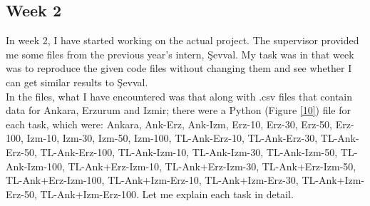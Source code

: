 \documentclass{article}
\begin{document}
\subsection{Week 2}
\hspace{0.5cm}
In week 2, I have started working on the actual project. The supervisor provided me some files from the previous year's intern, Şevval. My task was in that week was to reproduce the given code files without changing them and see whether I can get similar results to Şevval.\\

In the files, what I have encountered was that along with .csv files that contain data for Ankara, Erzurum and Izmir; there were a Python (Figure \ref{10}) file for each task, which were: Ankara, Ank-Erz, Ank-Izm, Erz-10, Erz-30, Erz-50, Erz-100, Izm-10, Izm-30, Izm-50, Izm-100, TL-Ank-Erz-10, TL-Ank-Erz-30, TL-Ank-Erz-50, TL-Ank-Erz-100, TL-Ank-Izm-10, TL-Ank-Izm-30, TL-Ank-Izm-50, TL-Ank-Izm-100, TL-Ank+Erz-Izm-10, TL-Ank+Erz-Izm-30, TL-Ank+Erz-Izm-50, TL-Ank+Erz-Izm-100, TL-Ank+Izm-Erz-10, TL-Ank+Izm-Erz-30, TL-Ank+Izm-Erz-50, TL-Ank+Izm-Erz-100. Let me explain each task in detail.
\end{document}
